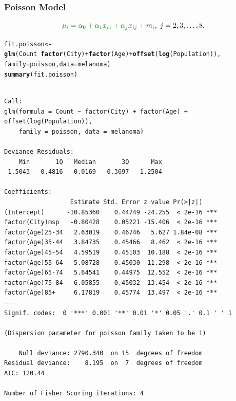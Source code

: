\documentclass[oneside]{book}\usepackage[]{graphicx}\usepackage[svgnames]{xcolor}
\makeatletter
\newcommand{\hlopt}[1]{\textcolor[rgb]{0,0,0}{#1}}%
\newcommand{\hlstd}[1]{\textcolor[rgb]{0.345,0.345,0.345}{#1}}%
\newcommand{\hlkwb}[1]{\textcolor[rgb]{0.69,0.353,0.396}{#1}}%
\newcommand{\hlkwc}[1]{\textcolor[rgb]{0.333,0.667,0.333}{#1}}%
\newcommand{\hlkwd}[1]{\textcolor[rgb]{0.737,0.353,0.396}{\textbf{#1}}}%
\newenvironment{kframe}{%
 \def\at@end@of@kframe{}%
 \ifinner\ifhmode%
  \def\at@end@of@kframe{\end{minipage}}%
  \begin{minipage}{\columnwidth}%
 \fi\fi%
 \def\FrameCommand##1{\hskip\@totalleftmargin \hskip-\fboxsep
 \colorbox{shadecolor}{##1}\hskip-\fboxsep
     \hskip-\linewidth \hskip-\@totalleftmargin \hskip\columnwidth}%
 \MakeFramed {\advance\hsize-\width
   \@totalleftmargin\z@ \linewidth\hsize
   \@setminipage}}%
 {\par\unskip\endMakeFramed%
 \at@end@of@kframe}
\newenvironment{knitrout}{}{} %
\let\log\relax%
\makeatother
\begin{document}
\subsubsection*{Poisson Model}
\[ \textcolor{Green}{\log{\mu_i}=\alpha_0+\alpha_1x_{i1}+\alpha_jx_{ij}+\log{m_i}},\; j=2,3,\ldots,8. \]
\begin{knitrout}
\color{fgcolor}\begin{kframe}
\begin{alltt}
\hlstd{fit.poisson} \hlkwb{<-} \hlkwd{glm}\hlstd{(Count} \hlopt{~} \hlkwd{factor}\hlstd{(City)} \hlopt{+} \hlkwd{factor}\hlstd{(Age)} \hlopt{+} \hlkwd{offset}\hlstd{(}\hlkwd{log}\hlstd{(Population)),}
  \hlkwc{family} \hlstd{= poisson,} \hlkwc{data} \hlstd{= melanoma)}
\hlkwd{summary}\hlstd{(fit.poisson)}
\end{alltt}
\begin{verbatim}

Call:
glm(formula = Count ~ factor(City) + factor(Age) + offset(log(Population)), 
    family = poisson, data = melanoma)

Deviance Residuals: 
    Min       1Q   Median       3Q      Max  
-1.5043  -0.4816   0.0169   0.3697   1.2504  

Coefficients:
                  Estimate Std. Error z value Pr(>|z|)    
(Intercept)      -10.85360    0.44749 -24.255  < 2e-16 ***
factor(City)msp   -0.80428    0.05221 -15.406  < 2e-16 ***
factor(Age)25-34   2.63019    0.46746   5.627 1.84e-08 ***
factor(Age)35-44   3.84735    0.45466   8.462  < 2e-16 ***
factor(Age)45-54   4.59519    0.45103  10.188  < 2e-16 ***
factor(Age)55-64   5.08728    0.45030  11.298  < 2e-16 ***
factor(Age)65-74   5.64541    0.44975  12.552  < 2e-16 ***
factor(Age)75-84   6.05855    0.45032  13.454  < 2e-16 ***
factor(Age)85+     6.17819    0.45774  13.497  < 2e-16 ***
---
Signif. codes:  0 '***' 0.001 '**' 0.01 '*' 0.05 '.' 0.1 ' ' 1

(Dispersion parameter for poisson family taken to be 1)

    Null deviance: 2790.340  on 15  degrees of freedom
Residual deviance:    8.195  on  7  degrees of freedom
AIC: 120.44

Number of Fisher Scoring iterations: 4
\end{verbatim}
\end{kframe}
\end{knitrout}
\end{document}
